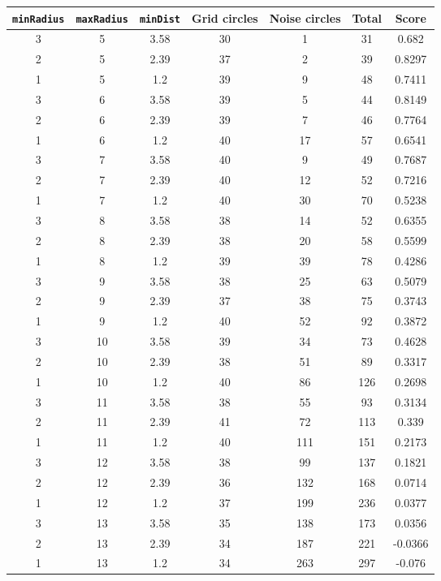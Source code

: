 \documentclass[letterpaper, 12pt]{article}
\begin{document}
\begin{longtable}{|c|c|c|c|c|c|c|}
\hline
\textbf{\texttt{minRadius}} & \textbf{\texttt{maxRadius}} & \textbf{\texttt{minDist}} & \textbf{Grid circles} & \textbf{Noise circles} & \textbf{Total} & \textbf{Score} \\
\hline
3 & 5 & 3.58 & 30 & 1 & 31 & 0.682 \\
\hline
2 & 5 & 2.39 & 37 & 2 & 39 & 0.8297 \\
\hline
1 & 5 & 1.2 & 39 & 9 & 48 & 0.7411 \\
\hline
3 & 6 & 3.58 & 39 & 5 & 44 & 0.8149 \\
\hline
2 & 6 & 2.39 & 39 & 7 & 46 & 0.7764 \\
\hline
1 & 6 & 1.2 & 40 & 17 & 57 & 0.6541 \\
\hline
3 & 7 & 3.58 & 40 & 9 & 49 & 0.7687 \\
\hline
2 & 7 & 2.39 & 40 & 12 & 52 & 0.7216 \\
\hline
1 & 7 & 1.2 & 40 & 30 & 70 & 0.5238 \\
\hline
3 & 8 & 3.58 & 38 & 14 & 52 & 0.6355 \\
\hline
2 & 8 & 2.39 & 38 & 20 & 58 & 0.5599 \\
\hline
1 & 8 & 1.2 & 39 & 39 & 78 & 0.4286 \\
\hline
3 & 9 & 3.58 & 38 & 25 & 63 & 0.5079 \\
\hline
2 & 9 & 2.39 & 37 & 38 & 75 & 0.3743 \\
\hline
1 & 9 & 1.2 & 40 & 52 & 92 & 0.3872 \\
\hline
3 & 10 & 3.58 & 39 & 34 & 73 & 0.4628 \\
\hline
2 & 10 & 2.39 & 38 & 51 & 89 & 0.3317 \\
\hline
1 & 10 & 1.2 & 40 & 86 & 126 & 0.2698 \\
\hline
3 & 11 & 3.58 & 38 & 55 & 93 & 0.3134 \\
\hline
2 & 11 & 2.39 & 41 & 72 & 113 & 0.339 \\
\hline
1 & 11 & 1.2 & 40 & 111 & 151 & 0.2173 \\
\hline
3 & 12 & 3.58 & 38 & 99 & 137 & 0.1821 \\
\hline
2 & 12 & 2.39 & 36 & 132 & 168 & 0.0714 \\
\hline
1 & 12 & 1.2 & 37 & 199 & 236 & 0.0377 \\
\hline
3 & 13 & 3.58 & 35 & 138 & 173 & 0.0356 \\
\hline
2 & 13 & 2.39 & 34 & 187 & 221 & -0.0366 \\
\hline
1 & 13 & 1.2 & 34 & 263 & 297 & -0.076 \\

\end{longtable}
\end{document}
